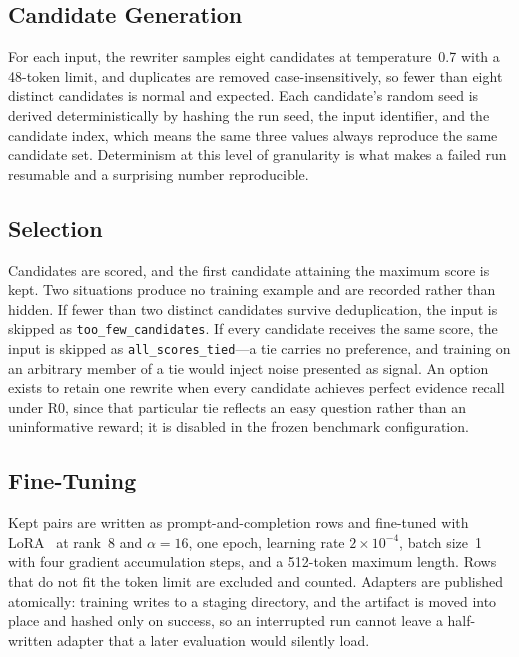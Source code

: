 \documentclass[12pt,letterpaper,oneside]{report}
\newcommand{\code}[1]{\texttt{\small #1}}
\newcommand{\Rz}{R0}
\begin{document}
\subsection{Candidate Generation}

For each input, the rewriter samples eight candidates at temperature~0.7 with a
48-token limit, and duplicates are removed case-insensitively, so fewer than
eight distinct candidates is normal and expected. Each candidate's random seed
is derived deterministically by hashing the run seed, the input identifier, and
the candidate index, which means the same three values always reproduce the
same candidate set. Determinism at this level of granularity is what makes a
failed run resumable and a surprising number reproducible.

\subsection{Selection}

Candidates are scored, and the first candidate attaining the maximum score is
kept. Two situations produce no training example and are recorded rather than
hidden. If fewer than two distinct candidates survive deduplication, the input
is skipped as \code{too\_few\_candidates}. If every candidate receives the same
score, the input is skipped as \code{all\_scores\_tied}---a tie carries no
preference, and training on an arbitrary member of a tie would inject noise
presented as signal. An option exists to retain one rewrite when every
candidate achieves perfect evidence recall under \Rz, since that particular tie
reflects an easy question rather than an uninformative reward; it is disabled
in the frozen benchmark configuration.

\subsection{Fine-Tuning}

Kept pairs are written as prompt-and-completion rows and fine-tuned with
LoRA~\cite{lora} at rank~8 and $\alpha=16$, one epoch, learning rate
$2\times10^{-4}$, batch size~1 with four gradient accumulation steps, and a
512-token maximum length. Rows that do not fit the token limit are excluded and
counted. Adapters are published atomically: training writes to a staging
directory, and the artifact is moved into place and hashed only on success, so
an interrupted run cannot leave a half-written adapter that a later evaluation
would silently load.
\end{document}
